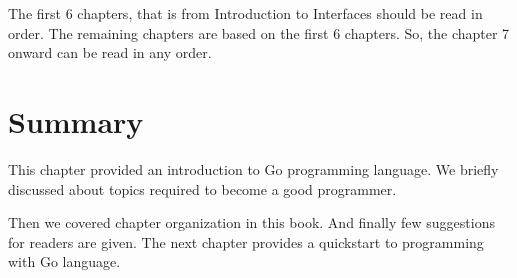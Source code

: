 The first 6 chapters, that is from Introduction to Interfaces should be read in
order. The remaining chapters are based on the first 6 chapters. So, the chapter
7 onward can be read in any order.

\section*{Summary}

This chapter provided an introduction to Go programming language. We briefly
discussed about topics required to become a good programmer.

Then we covered chapter organization in this book. And finally few suggestions
for readers are given. The next chapter provides a quickstart to programming
with Go language.
